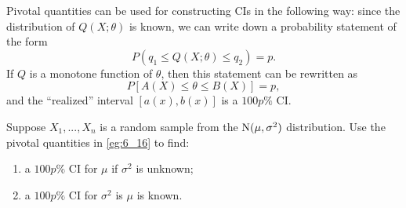 \documentclass[notoc,notitlepage]{tufte-book}
\begin{document}
Pivotal quantities can be used for constructing CIs in the following way: since the distribution of $Q(X; \theta)$ is known, we can write down a probability statement of the form
\begin{equation*}
  P(q_1 \leq Q(X; \theta) \leq q_2) = p.
\end{equation*}
If $Q$ is a monotone function of $\theta$, then this statement can be rewritten as
\begin{equation*}
  P[ A(X) \leq \theta \leq B(X) ] = p,
\end{equation*}
and the ``realized'' interval $[a(x), b(x)]$ is a $100p\%$ CI.

\begin{eg}
  Suppose $X_1, ..., X_n$ is a random sample from the $\operatorname{N}(\mu, \sigma^2)$ distribution. Use the pivotal quantities in \cref{eg:6_16} to find:
  \begin{enumerate}
    \item a $100p\%$ CI for $\mu$ if $\sigma^2$ is unknown;
    \item a $100p\%$ CI for $\sigma^2$ is $\mu$ is known.
  \end{enumerate}
\end{eg}
\end{document}
